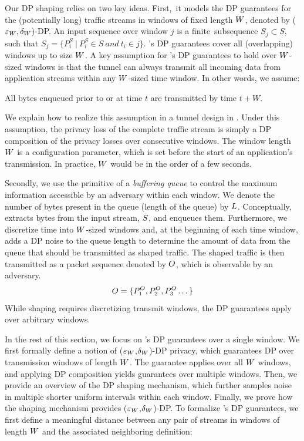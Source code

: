 Our DP shaping relies on two key ideas.
First,~it models the DP guarantees for the (potentially long) traffic streams in windows of fixed length $W$, denoted by \mbox{($\varepsilon_{W}, \delta_{W}$)-DP}.
An input sequence over window $j$ is a finite~sub\-sequence $S_{j} \subset S$, such that $S_{j} = \{ P^S_i~|~P^S_i \in S~and~t_i \in j \}$.
{\sys}'s DP guarantees cover all (overlapping) windows up to size $W$.
A key assumption for {\sys}'s DP guarantees to hold over $W$-sized windows is that the tunnel can always transmit all incoming data from application streams within any $W$-sized time window.
In other words, we assume:
\begin{assumption}\label{assumption:window}
  All bytes enqueued prior to or at time $t$ are transmitted by time
  $t+W$.
\end{assumption}
We explain how to realize this assumption in a tunnel design in {\addref}.
Under this assumption, the privacy loss of the complete traffic stream is simply a DP composition of the privacy losses over consecutive windows.
The window length $W$ is a configuration parameter, which is set before the start of an application's transmission. In practice, $W$ would be in the order of a few seconds.

Secondly, we use the primitive of a {\em buffering queue} to control the maximum information accessible by an adversary within each window.
We denote the number of bytes present in the queue (\ie length of the queue) by $L$.
Conceptually, {\sys} extracts bytes from the input stream, $S$, and enqueues them.
Furthermore, we discretize time into $W$-sized windows and, at the beginning of each time window, {\sys} adds a DP noise to the queue length to determine the amount of data from the queue that should be transmitted as shaped traffic.
The shaped traffic is then transmitted as a packet sequence denoted by $O$, which is observable by an adversary.
\begin{equation}
    O = \{{P^O_1}, {P^O_2}, {P^O_3} \dots \}
\end{equation}
While shaping requires discretizing transmit windows, the DP guarantees apply over arbitrary windows.

In the rest of this section, we focus on {\sys}'s DP guarantees over a single window.
We first formally define a notion of ($\varepsilon_W$,$\delta_W$)-DP privacy, which guarantees DP over transmission windows of length $W$.
The guarantee applies over all $W$ windows, and applying DP composition yields guarantees over multiple windows.
Then, we provide an overview of the DP shaping mechanism, which further samples noise in multiple shorter uniform intervals within each window.
Finally, we prove how the shaping mechanism provides ($\varepsilon_W$,$\delta_W$)-DP.
To formalize {\sys}'s DP guarantees, we first define a meaningful distance between any pair of streams in windows of length $W$ and the associated neighboring definition:

